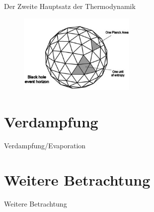 \documentclass[screen, ngerman]{beamer}
\begin{document}
	\begin{frame}{Der Zweite Hauptsatz der Thermodynamik}
		\begin{figure} [h] 
			\begin{center}
				\includegraphics[width=0.5\textwidth]{BHentropy1}
			\end{center}
		\end{figure}
	\end{frame}
	
	\section{Verdampfung}
	\begin{frame}{Verdampfung/Evaporation}
	\end{frame}
	
	\section{Weitere Betrachtung}
	\begin{frame}{Weitere Betrachtung}
	\end{frame}	
\end{document}
